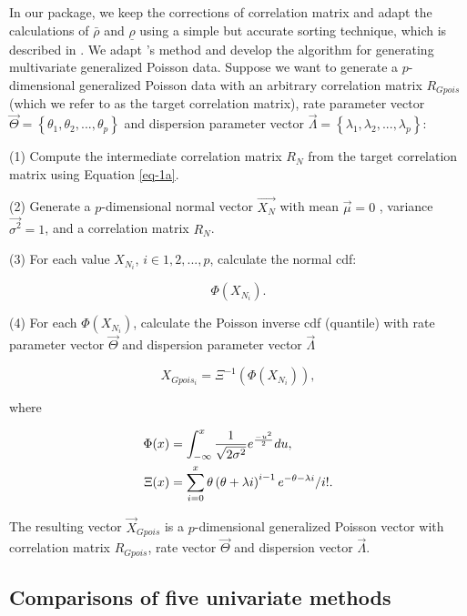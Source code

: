 In our package, we keep the corrections of correlation matrix and adapt the calculations of $\bar{\rho}$ and $\underline{\rho}$ using a simple but accurate sorting technique, which is described in \cite{demirtas2011practical}.
We adapt \cite{yahav2012generating}'s method and develop the algorithm for generating multivariate generalized Poisson data. Suppose we want to generate a $p$-dimensional generalized Poisson data with an arbitrary correlation matrix $R_{Gpois}$ (which we refer to as the target correlation matrix), rate parameter vector $\overrightarrow{\Theta}=\left\{\theta_1,\theta_2,...,\theta_p\right\}$ and dispersion parameter vector $\overrightarrow{\Lambda}=\left\{\lambda_1,\lambda_2,...,\lambda_p\right\}$:

\noindent (1) Compute the intermediate correlation matrix $R_N$ from the target correlation matrix using Equation \ref{eq-1a}.

\noindent (2) Generate a $p$-dimensional normal vector $\overrightarrow{X_{N}}$ with mean $\overrightarrow{\mu} = 0$ , variance $\overrightarrow{\sigma^2} = 1$, and a correlation matrix $R_{N}$. 

\noindent (3) For each value $X_{N_{i}}$, $i \in 1, 2,..., p$, calculate the normal cdf: 

\[
\Phi\left(X_{N_{i}}\right).
\]

\noindent (4) For each $\Phi({X_{N_{i}}})$, calculate the Poisson inverse cdf (quantile) with rate parameter vector $\overrightarrow{\Theta}$ and dispersion parameter vector $\overrightarrow{\Lambda}$

\[
X_{Gpois_{i}} = \Xi^{-1} \left(\Phi\left(X_{N_{i}}\right)\right),
\]

\noindent where

\begin{align}
\Phi(x) &= \int^{x}_{-\infty} \frac{1}{\sqrt{2\sigma^2}} e^{\frac{-u^2}{2}}du, \notag \\
\Xi (x) &= \sum^{x}_{i = 0} \theta \left(\theta + \lambda i\right)^{i - 1}e^{-\theta - \lambda i}/i !. \notag
\end{align}

The resulting vector $\overrightarrow{X}_{Gpois}$ is a $p$-dimensional generalized Poisson vector with correlation matrix $R_{Gpois}$, rate vector $\overrightarrow{\Theta}$ and dispersion vector $\overrightarrow{\Lambda}$.

\subsection{Comparisons of five univariate methods}

